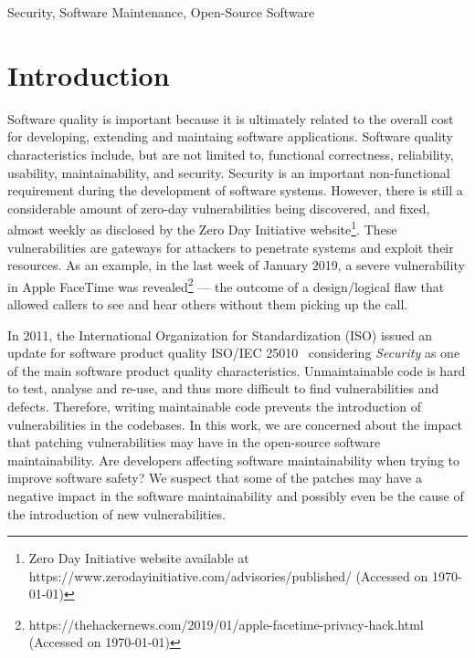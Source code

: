 \documentclass[10pt,conference]{IEEEtran}
\begin{document}
\begin{IEEEkeywords}
Security, Software Maintenance, Open-Source Software
\end{IEEEkeywords}

\section{Introduction}

Software quality is important because it is ultimately related to the overall
cost for developing, extending and maintaing software applications. Software
quality characteristics include, but are not limited to, functional correctness,
reliability, usability, maintainability, and security. Security is an important
non-functional requirement during the development of software systems.  However,
there is still a considerable amount of zero-day vulnerabilities being
discovered, and fixed, almost weekly as disclosed by the Zero Day Initiative
website\footnote{Zero Day Initiative website available  at
https://www.zerodayinitiative.com/advisories/published/ (Accessed on \today{})}.
These vulnerabilities are gateways for attackers to penetrate
systems and exploit their resources.
As an example, in the last week of January 2019, a severe vulnerability in Apple
FaceTime was revealed\footnote{https://thehackernews.com/2019/01/apple-facetime-privacy-hack.html
(Accessed on \today{})} --- the outcome of a design/logical flaw that allowed callers to see and
hear others without them picking up the call.


In 2011, the International Organization for Standardization (ISO) issued an
update for software product quality ISO/IEC 25010~\cite{iso:2011} considering
\emph{Security} as one of the main software product quality characteristics.
Unmaintainable code is hard to test, analyse and re-use, and thus more difficult
to find vulnerabilities and defects. Therefore, writing maintainable code
prevents the introduction of vulnerabilities in the codebases. In this work, we are
concerned about the impact that patching vulnerabilities may have in the
open-source software maintainability. Are developers affecting software
maintainability when trying to improve software safety? We suspect that some of
the patches may have a negative impact in the software maintainability and
possibly even be the cause of the introduction of new vulnerabilities.
\end{document}
